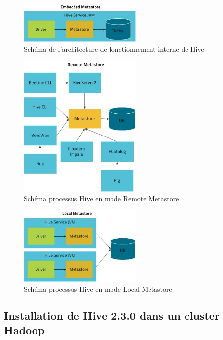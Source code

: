 \documentclass[12pt,english]{book}
\begin{document}
\begin{figure}[H]
	\centering
	\includegraphics[width=6cm]{hiveEmbeddedMetaStore}
	\caption[Schéma processus Hive en mode Embedded Metastore]{Schéma de l'architecture de fonctionnement interne de Hive \footnotemark}
\end{figure}



\begin{figure}[H]
	\centering
	\includegraphics[width=6cm]{hiveRemoteMetaStore}
	\caption[Schéma processus Hive en mode Remote Metastore]{Schéma processus Hive en mode Remote Metastore}
\end{figure}

\begin{figure}[H]
	\centering
	\includegraphics[width=6cm]{hiveLocalMetaStore}
	\caption[Schéma processus Hive en mode Local Metastore]{Schéma processus Hive en mode Local Metastore}
\end{figure}

\subsection{Installation de Hive 2.3.0 dans un cluster Hadoop}
\end{document}
